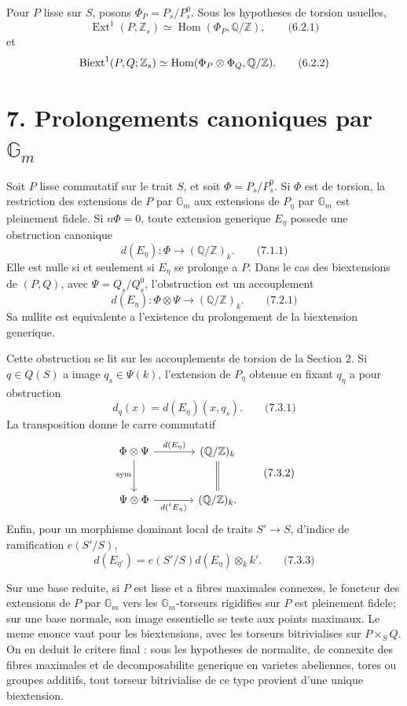 \documentclass[11pt]{article}
\providecommand{\Z}{\mathbb Z}
\providecommand{\Q}{\mathbb Q}
\providecommand{\Gm}{\mathbb G_m}
\providecommand{\Hom}{\operatorname{Hom}}
\providecommand{\Ext}{\operatorname{Ext}}
\begin{document}
Pour \(P\) lisse sur \(S\), posons \(\Phi_P=P_s/P_s^0\).  Sous les hypotheses de torsion usuelles,
\[
        \Ext^1(P,\Z_s)\simeq \Hom(\Phi_P,\Q/\Z),
\qquad\text{(6.2.1)}
\]
et
\[
        \Biext^1(P,Q;\Z_s)\simeq \Hom(\Phi_P\otimes\Phi_Q,\Q/\Z).
\qquad\text{(6.2.2)}
\]

\section*{7. Prolongements canoniques par \(\Gm\)}

Soit \(P\) lisse commutatif sur le trait \(S\), et soit \(\Phi=P_s/P_s^0\).  Si \(\Phi\) est de torsion, la restriction des extensions de \(P\) par \(\Gm\) aux extensions de \(P_\eta\) par \(\Gm\) est pleinement fidele.  Si \(n\Phi=0\), toute extension generique \(E_\eta\) possede une obstruction canonique
\[
        d(E_\eta):\Phi\longrightarrow (\Q/\Z)_k.
\qquad\text{(7.1.1)}
\]
Elle est nulle si et seulement si \(E_\eta\) se prolonge a \(P\).  Dans le cas des biextensions de \((P,Q)\), avec \(\Psi=Q_s/Q_s^0\), l'obstruction est un accouplement
\[
        d(E_\eta):\Phi\otimes\Psi\longrightarrow (\Q/\Z)_k.
\qquad\text{(7.2.1)}
\]
Sa nullite est equivalente a l'existence du prolongement de la biextension generique.

Cette obstruction se lit sur les accouplements de torsion de la Section 2.  Si \(q\in Q(S)\) a image \(q_s\in\Psi(k)\), l'extension de \(P_\eta\) obtenue en fixant \(q_\eta\) a pour obstruction
\[
        d_q(x)=d(E_\eta)(x,q_s).
\qquad\text{(7.3.1)}
\]
La transposition donne le carre commutatif
\[
\begin{tikzcd}[column sep=large,row sep=large]
 \Phi\otimes\Psi \arrow[r,"d(E_\eta)"]\arrow[d,"\mathrm{sym}"'] & (\Q/\Z)_k\arrow[d,equal]\\
 \Psi\otimes\Phi \arrow[r,"d({}^tE_\eta)"'] & (\Q/\Z)_k .
\end{tikzcd}
\qquad\text{(7.3.2)}
\]
Enfin, pour un morphisme dominant local de traits \(S'\to S\), d'indice de ramification \(e(S'/S)\),
\[
        d(E_{\eta'})=e(S'/S)d(E_\eta)\otimes_k k'.
\qquad\text{(7.3.3)}
\]

Sur une base reduite, si \(P\) est lisse et a fibres maximales connexes, le foncteur des extensions de \(P\) par \(\Gm\) vers les \(\Gm\)-torseurs rigidifies sur \(P\) est pleinement fidele; sur une base normale, son image essentielle se teste aux points maximaux.  Le meme enonce vaut pour les biextensions, avec les torseurs bitrivialises sur \(P\times_S Q\).  On en deduit le critere final : sous les hypotheses de normalite, de connexite des fibres maximales et de decomposabilite generique en varietes abeliennes, tores ou groupes additifs, tout torseur bitrivialise de ce type provient d'une unique biextension.
\end{document}
